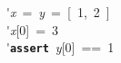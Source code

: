 \'\>\textit{x}~=~\textit{y}~=~[~1,~2~]\\

\'\>\textit{x}[0]~=~3\\

\'\>\texttt{\textbf{assert}}~\textit{y}[0]~==~1